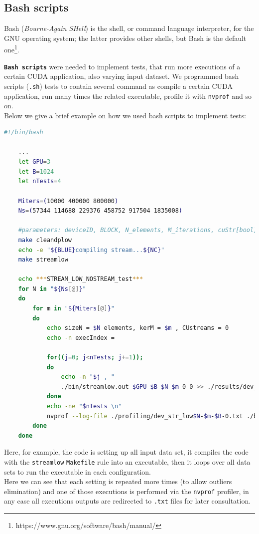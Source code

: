 	\subsection{Bash scripts}
	\label{subs:bash}
	Bash (\textit{Bourne-Again SHell}) is the shell, or command language interpreter, for the GNU operating system; the latter provides other shells, but Bash is the default  one\footnote{https://www.gnu.org/software/bash/manual/}. 
	
	\textbf{\texttt{Bash scripts}} were needed to implement tests, that run more executions of a certain CUDA application, also varying input dataset.
	We programmed bash scripts (\texttt{.sh}) tests to contain several command as compile a certain CUDA application, run many times the related executable, profile it with \texttt{nvprof} and so on.\\
	Below we give a brief example on how we used bash scripts to implement tests:
	\begin{lstlisting}[caption={Tests on bash scripts example},language=bash]
	#!/bin/bash
	
	...			
	let GPU=3
	let B=1024
	let nTests=4

	Miters=(10000 400000 800000)
	Ns=(57344 114688 229376 458752 917504 1835008)
		
	#parameters: deviceID, BLOCK, N_elements, M_iterations, cuStr[bool], strNum
	make cleandplow
	echo -e "${BLUE}compiling stream...${NC}"	
	make streamlow
	
	echo ***STREAM_LOW_NOSTREAM_test***
	for N in "${Ns[@]}"
	do			
		for m in "${Miters[@]}"
		do	
			echo sizeN = $N elements, kerM = $m , CUstreams = 0 
			echo -n execIndex = 
			
			for((j=0; j<nTests; j+=1));
			do
				echo -n "$j , "
				./bin/streamlow.out $GPU $B $N $m 0 0 >> ./results/dev_cos_dp_stl.txt
			done
			echo -ne "$nTests \n"			
			nvprof --log-file ./profiling/dev_str_low$N-$m-$B-0.txt ./bin/streamlow.out $GPU $B $N $m 0 0 >> ./results/dev_cos_dp_stl.txt
		done
	done
	\end{lstlisting}
	Here, for example, the code is setting up all input data set, it compiles the code with the \texttt{streamlow} \texttt{Makefile} rule into an executable, then it loops over all data sets to run the executable in each configuration.\\
	Here we can see that each setting is repeated more times (to allow outliers elimination) and one of those executions is performed via the \texttt{nvprof} profiler, in any case all executions outputs are redirected to \texttt{.txt} files for later consultation.
	
